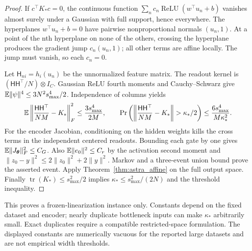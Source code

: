 \begin{proof}
If $c^\top K_*c=0$, the continuous function
$\sum_nc_n\operatorname{ReLU}(w^\top u_n+b)$ vanishes almost surely
under a Gaussian with full support, hence everywhere. The hyperplanes
$w^\top u_n+b=0$ have pairwise nonproportional normals $(u_n,1)$.
At a point of the nth hyperplane on none of the others, crossing the
hyperplane produces the gradient jump $c_n(u_n,1)$; all other terms
are affine locally. The jump must vanish, so each $c_n=0$.

Let $\mathsf H_{ni}=h_i(u_n)$ be the unnormalized feature matrix.
The readout kernel is $(\mathsf H\mathsf H^\top/N)\otimes I_C$.
Gaussian ReLU fourth moments and Cauchy--Schwarz give
$\mathbb{E}\|\psi\|^4\le3N^2s_{\max}^4/2$. Independence of columns yields
\[
 \E\left\|\frac{\mathsf H\mathsf H^\top}{NM}-K_*\right\|_F^2
 \le\frac{3s_{\max}^4}{2M},\qquad
 \Pr\left(\left\|\frac{\mathsf H\mathsf H^\top}{NM}-K_*\right\|>
                  \kappa_*/2\right)
 \le\frac{6s_{\max}^4}{M\kappa_*^2}.
\]
For the encoder Jacobian, conditioning on the hidden weights kills the
cross terms in the independent centered readouts. Bounding each gate by
one gives $\mathbb{E}\|J_{\boldsymbol{\theta}}\|_F^2\le C_G$. Also
$\mathbb{E}\|e_0\|^2\le C_r$ by the activation second moment and
$\|z_0-y\|^2\le2\|z_0\|^2+2\|y\|^2$.
Markov and a three-event union bound prove the asserted event.
Apply Theorem~\ref{thm:astra_affine} on the full output space.
Finally $\operatorname{tr}(K_*)\le s_{\max}^2/2$ implies
$\kappa_*\le s_{\max}^2/(2N)$ and the threshold inequality.
\end{proof}
\begin{remark}
This proves a frozen-linearization instance only. Constants depend on
the fixed dataset and encoder; nearly duplicate bottleneck inputs can
make $\kappa_*$ arbitrarily small. Exact duplicates require a compatible
restricted-space formulation. The displayed constants are numerically
vacuous for the reported large datasets and are not empirical width thresholds.
\end{remark}

